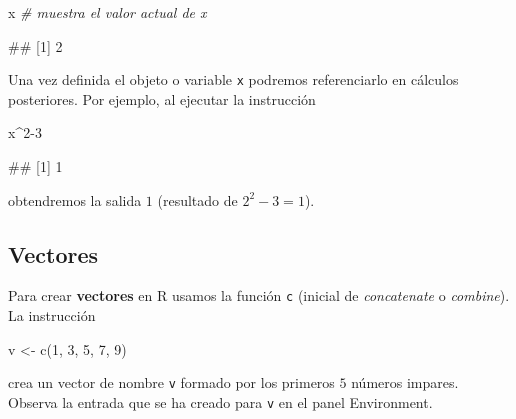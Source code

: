 \documentclass[
  title=normal,
  notoc,
  bib=normal]{mnye}
\newenvironment{Shaded}{\begin{snugshade}}{\end{snugshade}}
\newcommand{\CommentTok}[1]{\textcolor[rgb]{0.56,0.35,0.01}{\textit{#1}}}
\newcommand{\DecValTok}[1]{\textcolor[rgb]{0.00,0.00,0.81}{#1}}
\newcommand{\FunctionTok}[1]{\textcolor[rgb]{0.00,0.00,0.00}{#1}}
\newcommand{\NormalTok}[1]{#1}
\newcommand{\OtherTok}[1]{\textcolor[rgb]{0.56,0.35,0.01}{#1}}
\newcommand{\SpecialCharTok}[1]{\textcolor[rgb]{0.00,0.00,0.00}{#1}}
\begin{document}
\begin{Shaded}
\begin{Highlighting}[]
\NormalTok{x }\CommentTok{\# muestra el valor actual de x}
\end{Highlighting}
\end{Shaded}

\begin{Shaded}
\begin{Highlighting}[]
\NormalTok{\#\# [1] 2}
\end{Highlighting}
\end{Shaded}

Una vez definida el objeto o variable \texttt{x} podremos referenciarlo en cálculos posteriores. Por ejemplo, al ejecutar la instrucción

\begin{Shaded}
\begin{Highlighting}[]
\NormalTok{x}\SpecialCharTok{\^{}}\DecValTok{2{-}3}
\end{Highlighting}
\end{Shaded}

\begin{Shaded}
\begin{Highlighting}[]
\NormalTok{\#\# [1] 1}
\end{Highlighting}
\end{Shaded}

obtendremos la salida \(1\) (resultado de \(2^2-3 = 1\)).

\hypertarget{vectores}{%
\subsection{Vectores}\label{vectores}}

Para crear \textbf{vectores} en \textsf{R} usamos la función \texttt{c} (inicial de \emph{concatenate} o \emph{combine}). La instrucción

\begin{Shaded}
\begin{Highlighting}[]
\NormalTok{v }\OtherTok{\textless{}{-}} \FunctionTok{c}\NormalTok{(}\DecValTok{1}\NormalTok{, }\DecValTok{3}\NormalTok{, }\DecValTok{5}\NormalTok{, }\DecValTok{7}\NormalTok{, }\DecValTok{9}\NormalTok{)}
\end{Highlighting}
\end{Shaded}

crea un vector de nombre \texttt{v} formado por los primeros \(5\) números impares. Observa la entrada que se ha creado para \texttt{v} en el panel Environment.
\end{document}
